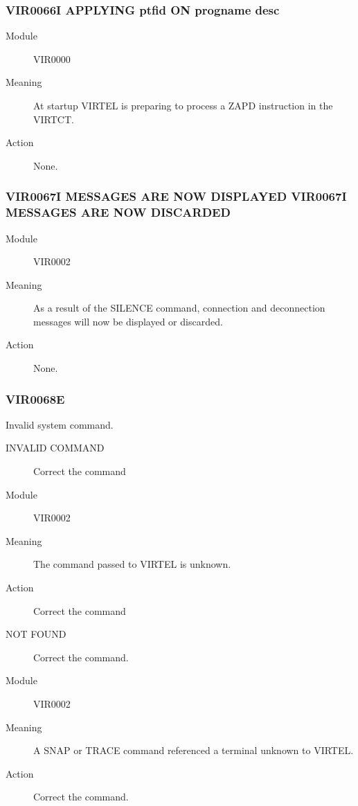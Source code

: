 \documentclass[letterpaper,10pt,english]{sphinxmanual}
\begin{document}
\subsubsection{VIR0066I APPLYING ptfid ON progname desc}
\label{\detokenize{messages:vir0066i-applying-ptfid-on-progname-desc}}\begin{description}
\item[{Module}] \leavevmode
VIR0000

\item[{Meaning}] \leavevmode
At startup VIRTEL is preparing to process a ZAPD instruction in the VIRTCT.

\item[{Action}] \leavevmode
None.

\end{description}


\subsubsection{VIR0067I MESSAGES ARE NOW DISPLAYED VIR0067I MESSAGES ARE NOW DISCARDED}
\label{\detokenize{messages:vir0067i-messages-are-now-displayed-vir0067i-messages-are-now-discarded}}\begin{description}
\item[{Module}] \leavevmode
VIR0002

\item[{Meaning}] \leavevmode
As a result of the SILENCE command, connection and deconnection messages will now be displayed or discarded.

\item[{Action}] \leavevmode
None.

\end{description}


\subsubsection{VIR0068E}
\label{\detokenize{messages:vir0068e}}
Invalid system command.
\begin{description}
\item[{INVALID COMMAND}] \leavevmode
Correct the command

\item[{Module}] \leavevmode
VIR0002

\item[{Meaning}] \leavevmode
The command passed to VIRTEL is unknown.

\item[{Action}] \leavevmode
Correct the command

\item[{NOT FOUND}] \leavevmode
Correct the command.

\item[{Module}] \leavevmode
VIR0002

\item[{Meaning}] \leavevmode
A SNAP or TRACE command referenced a terminal unknown to VIRTEL.

\item[{Action}] \leavevmode
Correct the command.

\end{description}
\end{document}
